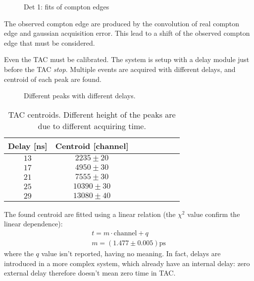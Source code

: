 \documentclass[11pt,a4 paper]{article}
\begin{document}
\begin{figure}[H]
    \centering
    \caption{Det 1: fits of compton edges}
    \label{fig:det1:calibr}
\end{figure}

The observed compton edge are produced by the convolution of real compton edge and gaussian acquisition error. This lead to a shift of the observed compton edge that must be considered.


Even the TAC must be calibrated. The system is setup with a delay module just before the TAC \emph{stop}. Multiple events are acquired with different delays, and centroid of each peak are found.

\begin{figure}[H]
    \centering
    \caption{Different peaks with different delays.}
    \label{fig:tac:calibr}
\end{figure}

\begin{table}[H]
    \centering
    \begin{tabular}{cccccccc}
        \toprule
        Delay [ns] & Centroid [channel] \\
        \midrule
        $13$ & $2235\pm 20$ \\
        $17$ & $4950\pm 30$ \\
        $21$ & $7555\pm 30$ \\
        $25$ & $10390\pm 30$ \\
        $29$ & $13080\pm 40$ \\
        \bottomrule
    \end{tabular}
    \caption{TAC centroids. Different height of the peaks are due to different acquiring time.}
    \label{tab:tac:calibr}
\end{table}

The found centroid are fitted using a linear relation (the $\chi^2$ value confirm the linear dependence):
\begin{gather*}
    t = m\cdot \text{channel} + q \\
    m = ( 1.477 \pm 0.005) \si{\pico\second}
\end{gather*}
where the $q$ value isn't reported, having no meaning. In fact, delays are introduced in a more complex system, which already have an internal delay: zero external delay therefore doesn't mean zero time in TAC. 
\end{document}
